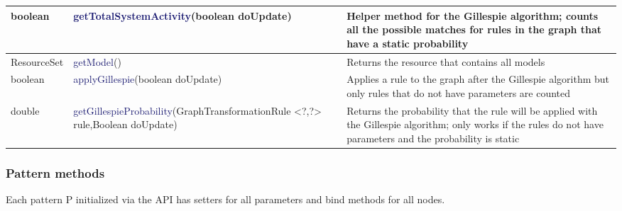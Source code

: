 {\begin{center}
\begin{tabular}{ | m{4.25cm} | m{4.25cm} | m{4.5cm} | }
\hline
\textsf{boolean} & \textcolor{MidnightBlue}{getTotalSystemActivity}(boolean doUpdate) & Helper method for the Gillespie algorithm; counts all the possible matches for rules in the graph that have a static probability \\
\hline
\textsf{ResourceSet} & \textcolor{MidnightBlue}{getModel}() & Returns the resource that contains all models \\
\hline
\textsf{boolean} & \textcolor{MidnightBlue}{applyGillespie}(boolean doUpdate) & Applies a rule to the graph after the Gillespie algorithm but only rules that do not have parameters are counted \\
\hline
\textsf{double} & \textcolor{MidnightBlue}{getGillespieProbability\newline}(GraphTransformationRule <?,?> rule,\newline Boolean doUpdate) & Returns the probability that the rule will be applied with the Gillespie algorithm; only works if the rules do not have parameters and the probability is static \\
\hline
\end{tabular}
\end{center}

}

\clearpage

\subsubsection{Pattern methods}

Each pattern P initialized via the API has setters for all parameters and bind methods for all nodes.\newline\newline

